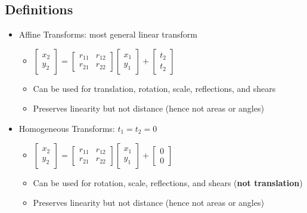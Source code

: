 \documentclass[../main.tex]{subfiles}
\begin{document}
  \subsection{Definitions}
  \begin{itemize}
    \item Affine Transforms: most general linear transform
    \begin{itemize}
      \item $\begin{bmatrix} x_{2} \\ y_{2} \end{bmatrix} = \begin{bmatrix} r_{11} & r_{12} \\ r_{21} & r_{22} \end{bmatrix} \begin{bmatrix} x_{1} \\ y_{1} \end{bmatrix} + \begin{bmatrix} t_{2} \\ t_{2} \end{bmatrix}$
      \item Can be used for translation, rotation, scale, reflections, and shears
      \item Preserves linearity but not distance (hence not areas or angles)
    \end{itemize}

    \item Homogeneous Transforms: $t_{1} = t_{2} = 0$
    \begin{itemize}
      \item $\begin{bmatrix} x_{2} \\ y_{2} \end{bmatrix} = \begin{bmatrix} r_{11} & r_{12} \\ r_{21} & r_{22} \end{bmatrix} \begin{bmatrix} x_{1} \\ y_{1} \end{bmatrix} + \begin{bmatrix} 0 \\ 0 \end{bmatrix}$
      \item Can be used for rotation, scale, reflections, and shears (\textbf{not translation})
      \item Preserves linearity but not distance (hence not areas or angles)
    \end{itemize}


\end{itemize}
\end{document}
